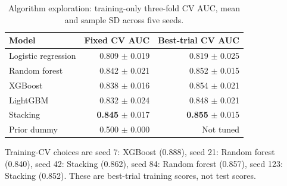 \begin{table}[H]
\centering\small
\caption{Algorithm exploration: training-only three-fold CV AUC, mean and sample SD across five seeds.}
\label{tab:holdout-selection}
\begin{tabular}{lrr}
\toprule
Model & Fixed CV AUC & Best-trial CV AUC \\
\midrule
Logistic regression & 0.809 $\pm$ 0.019 & 0.819 $\pm$ 0.025 \\
Random forest & 0.842 $\pm$ 0.021 & 0.852 $\pm$ 0.015 \\
XGBoost & 0.838 $\pm$ 0.016 & 0.854 $\pm$ 0.021 \\
LightGBM & 0.832 $\pm$ 0.024 & 0.848 $\pm$ 0.021 \\
Stacking & \textbf{0.845} $\pm$ 0.017 & \textbf{0.855} $\pm$ 0.015 \\
Prior dummy & 0.500 $\pm$ 0.000 & Not tuned \\
\bottomrule
\end{tabular}
\end{table}
Training-CV choices are seed 7: XGBoost (0.888), seed 21: Random forest (0.840), seed 42: Stacking (0.862), seed 84: Random forest (0.857), seed 123: Stacking (0.852). These are best-trial training scores, not test scores.

